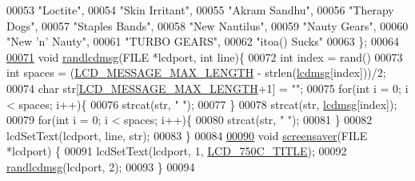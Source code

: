 \begin{DoxyCode}
00053     \textcolor{stringliteral}{"Loctite"},
00054     \textcolor{stringliteral}{"Skin Irritant"},
00055     \textcolor{stringliteral}{"Akram Sandhu"},
00056     \textcolor{stringliteral}{"Therapy Dogs"},
00057     \textcolor{stringliteral}{"Staples Bands"},
00058     \textcolor{stringliteral}{"New Nautilus"},
00059     \textcolor{stringliteral}{"Nauty Gears"},
00060     \textcolor{stringliteral}{"New 'n' Nauty"},
00061     \textcolor{stringliteral}{"TURBO GEARS"},
00062     \textcolor{stringliteral}{"itoa() Sucks"}
00063 \};
00064 
\hypertarget{lcdmsg_8c_source.tex_l00071}{}\hyperlink{lcdmsg_8h_aabe33dfb797df5997c5e03078591aa81}{00071} \textcolor{keywordtype}{void} \hyperlink{lcdmsg_8c_aabe33dfb797df5997c5e03078591aa81}{randlcdmsg}(FILE *lcdport, \textcolor{keywordtype}{int} line)\{
00072     \textcolor{keywordtype}{int} index = rand() %
00073     \textcolor{keywordtype}{int} spaces = (\hyperlink{lcdmsg_8h_abe4c4b70fc6f44ae3680e5b2c68cdd00}{LCD\_MESSAGE\_MAX\_LENGTH} - strlen(\hyperlink{lcdmsg_8c_abbcf1856a4c9063200ef3f4131fd05f5}{lcdmsg}[index]))/2;
00074     \textcolor{keywordtype}{char} str[\hyperlink{lcdmsg_8h_abe4c4b70fc6f44ae3680e5b2c68cdd00}{LCD\_MESSAGE\_MAX\_LENGTH}+1] = \textcolor{stringliteral}{""};
00075     \textcolor{keywordflow}{for}(\textcolor{keywordtype}{int} i = 0; i < spaces; i++)\{
00076         strcat(str, \textcolor{stringliteral}{" "});
00077     \}
00078     strcat(str, \hyperlink{lcdmsg_8c_abbcf1856a4c9063200ef3f4131fd05f5}{lcdmsg}[index]);
00079     \textcolor{keywordflow}{for}(\textcolor{keywordtype}{int} i = 0; i < spaces; i++)\{
00080         strcat(str, \textcolor{stringliteral}{" "});
00081     \}
00082     lcdSetText(lcdport, line, str);
00083 \}
00084 
\hypertarget{lcdmsg_8c_source.tex_l00090}{}\hyperlink{lcdmsg_8h_acc19fe50b302412c894538965e77cb8b}{00090} \textcolor{keywordtype}{void} \hyperlink{lcdmsg_8c_acc19fe50b302412c894538965e77cb8b}{screensaver}(FILE *lcdport) \{
00091     lcdSetText(lcdport, 1, \hyperlink{lcdmsg_8h_aa9575881ef196e5c94e60d183742eee7}{LCD\_750C\_TITLE});
00092     \hyperlink{lcdmsg_8c_aabe33dfb797df5997c5e03078591aa81}{randlcdmsg}(lcdport, 2);
00093 \}
00094 
\end{DoxyCode}
